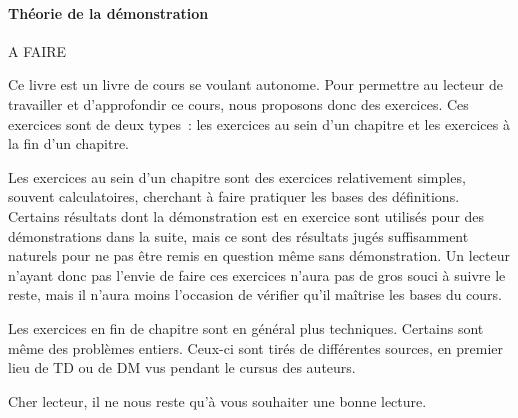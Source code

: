 \paragraph{Théorie de la démonstration}
A FAIRE

Ce livre est un livre de cours se voulant autonome. Pour permettre au lecteur de
travailler et d'approfondir ce cours, nous proposons donc des exercices. Ces
exercices sont de deux types~: les exercices au sein d'un chapitre et les
exercices à la fin d'un chapitre.

Les exercices au sein d'un chapitre sont des exercices relativement simples,
souvent calculatoires, cherchant à faire pratiquer les bases des définitions.
Certains résultats dont la démonstration est en exercice sont utilisés pour des
démonstrations dans la suite, mais ce sont des résultats jugés suffisamment
naturels pour ne pas être remis en question même sans démonstration. Un lecteur
n'ayant donc pas l'envie de faire ces exercices n'aura pas de gros souci à
suivre le reste, mais il n'aura moins l'occasion de vérifier qu'il maîtrise les
bases du cours.

Les exercices en fin de chapitre sont en général plus techniques. Certains sont
même des problèmes entiers. Ceux-ci sont tirés de différentes sources, en
premier lieu de TD ou de DM vus pendant le cursus des auteurs.

Cher lecteur, il ne nous reste qu'à vous souhaiter une bonne lecture.
